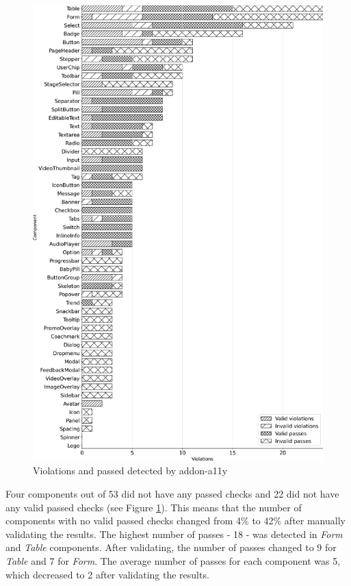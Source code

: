 \documentclass{master_thesis}
\begin{document}
\begin{figure}[H]
	\centering
	\includegraphics[width=\textwidth]{img/audit/combined_bw.png}
\caption{Violations and passed detected by addon-a11y}
\label{fig:audit-combined}
\end{figure}

Four components out of 53 did not have any passed checks and 22 did not have any valid passed checks (see Figure \ref{fig:audit-combined}). This means that the number of components with no valid passed checks changed from 4\%  to 42\% after manually validating the results. The highest number of passes - 18 - was detected in \textit{Form} and \textit{Table} components. After validating, the number of passes changed to 9 for \textit{Table} and 7 for \textit{Form}. The average number of passes for each component was 5, which decreased to 2 after validating the results.
\end{document}
